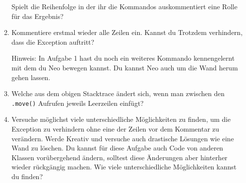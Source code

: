 \begin{enumerate}[label=\alph*)]
        Spielt die Reihenfolge in der ihr die Kommandos auskommentiert eine Rolle für das Ergebnis?
    \item Kommentiere erstmal wieder alle Zeilen ein.
        Kannst du Trotzdem verhindern, dass die Exception auftritt?

        Hinweis: In Aufgabe 1 hast du noch ein weiteres Kommando kennengelernt mit dem du Neo bewegen kannst.
        Du kannst Neo auch um die Wand herum gehen lassen.
    \item \optional Welche  aus dem obigen Stacktrace ändert sich, wenn man zwischen den \lstinline{.move()} Aufrufen jeweils Leerzeilen einfügt?
    \item \optional Versuche möglichst viele unterschiedliche Möglichkeiten zu finden, um die Exception zu verhindern ohne eine der Zeilen vor dem Kommentar zu verändern.
        Werde Kreativ und versuche auch drastische Lösungen wie eine Wand zu löschen.
        Du kannst für diese Aufgabe auch Code von anderen Klassen vorübergehend ändern, solltest diese Änderungen aber hinterher wieder rückgängig machen.
        Wie viele unterschiedliche Möglichkeiten kannst du finden?
\end{enumerate}
 
